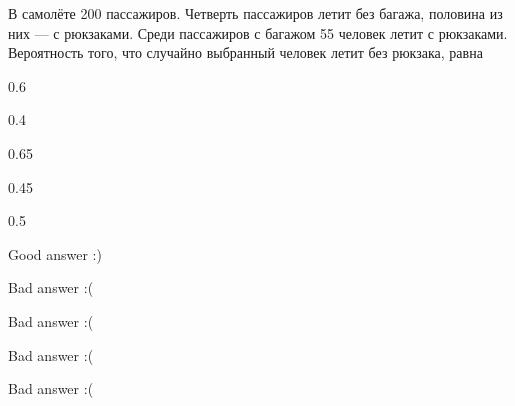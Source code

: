
\begin{question}
В самолёте 200 пассажиров. Четверть пассажиров летит без багажа,
половина из них --- с рюкзаками. Среди пассажиров с багажом 55 человек
летит с рюкзаками. Вероятность того, что случайно выбранный человек
летит без рюкзака, равна
\begin{answerlist}
  \item 0.6
  \item 0.4
  \item 0.65
  \item 0.45
  \item 0.5
\end{answerlist}
\end{question}

\begin{solution}
\begin{answerlist}
  \item Good answer :)
  \item Bad answer :(
  \item Bad answer :(
  \item Bad answer :(
  \item Bad answer :(
\end{answerlist}
\end{solution}

